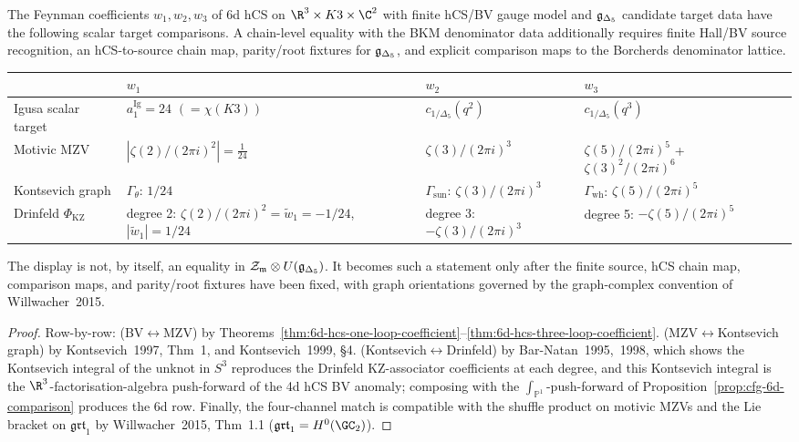 \begin{theorem}
\label{thm:four-channel-match}
The Feynman coefficients $w_1, w_2, w_3$ of 6d hCS on
$\R^3\times K3\times\C^2$ with finite hCS/BV gauge model and
$\mathfrak{g}_{\Delta_5}$ candidate target data have the following scalar
target comparisons. A chain-level equality with the BKM
denominator data additionally requires finite Hall/BV source
recognition, an hCS-to-source chain map, parity/root fixtures for
$\mathfrak{g}_{\Delta_5}$, and explicit comparison maps to the Borcherds
denominator lattice.

\begin{center}
\renewcommand{\arraystretch}{1.28}
\begin{tabular}{l|l|l|l|l}
 & $w_1$ & $w_2$ & $w_3$ \\
\hline
Igusa scalar target
& $a_1^{\mathrm{Ig}} = 24$ $(=\chi(K3))$
& $c_{1/\Delta_5}(q^2)$
& $c_{1/\Delta_5}(q^3)$
\\
Motivic MZV
& $|\zeta(2)/(2\pi i)^2| = \tfrac{1}{24}$
& $\zeta(3)/(2\pi i)^3$
& $\zeta(5)/(2\pi i)^5$ + $\zeta(3)^2/(2\pi i)^6$
\\
Kontsevich graph
& $\Gamma_\theta$: $1/24$
& $\Gamma_{\mathrm{sun}}$: $\zeta(3)/(2\pi i)^3$
& $\Gamma_{\mathrm{wh}}$: $\zeta(5)/(2\pi i)^5$
\\
Drinfeld $\Phi_{\mathrm{KZ}}$
& degree 2: $\zeta(2)/(2\pi i)^2=\widetilde w_1=-1/24$, $|\widetilde w_1|=1/24$
& degree 3: $-\zeta(3)/(2\pi i)^3$
& degree 5: $-\zeta(5)/(2\pi i)^5$
\end{tabular}
\end{center}

The display is not, by itself, an equality in
$\mathcal{Z}_{\mathfrak m}\otimes U(\mathfrak{g}_{\Delta_5})$. It becomes such a statement only
after the finite source, hCS chain map, comparison maps, and parity/root
fixtures have been fixed, with graph orientations governed by the
graph-complex convention of Willwacher~2015.
\end{theorem}

\begin{proof}
Row-by-row:
(BV$\leftrightarrow$MZV) by
Theorems~\ref{thm:6d-hcs-one-loop-coefficient}--\ref{thm:6d-hcs-three-loop-coefficient}.
(MZV$\leftrightarrow$Kontsevich graph) by Kontsevich~1997, Thm~1, and
Kontsevich~1999, \S4.
(Kontsevich$\leftrightarrow$Drinfeld) by Bar-Natan~1995,~1998, which
shows the Kontsevich integral of the unknot in $S^3$ reproduces
the Drinfeld KZ-associator coefficients at each degree, and this
Kontsevich integral is the $\R^3$-factorisation-algebra push-forward
of the 4d hCS BV anomaly; composing with the
$\int_{\mathbb{P}^1}$-push-forward of
Proposition~\ref{prop:cfg-6d-comparison} produces the 6d row.
Finally, the four-channel match is compatible with the shuffle product
on motivic MZVs and the Lie bracket on $\mathfrak{grt}_1$ by
Willwacher~2015, Thm~1.1 ($\mathfrak{grt}_1 = H^0(\GC_2)$).
\end{proof}

